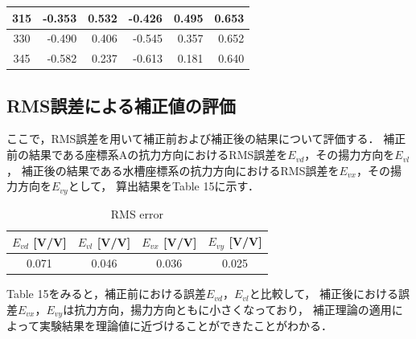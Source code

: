 \begin{table}[htbp]
\begin{center}
\begin{tabular}{|p{20mm}|p{20mm}|p{20mm}|p{20mm}|p{20mm}|p{20mm}|}
      \multicolumn{1}{|c|}{315}                     & \multicolumn{1}{|r|}{-0.353}               & \multicolumn{1}{|r|}{0.532}                & \multicolumn{1}{|r|}{-0.426}               & \multicolumn{1}{|r|}{0.495}                & \multicolumn{1}{|r|}{0.653}                    \\ \hline
      \multicolumn{1}{|c|}{330}                     & \multicolumn{1}{|r|}{-0.490}               & \multicolumn{1}{|r|}{0.406}                & \multicolumn{1}{|r|}{-0.545}               & \multicolumn{1}{|r|}{0.357}                & \multicolumn{1}{|r|}{0.652}                    \\ \hline
      \multicolumn{1}{|c|}{345}                     & \multicolumn{1}{|r|}{-0.582}               & \multicolumn{1}{|r|}{0.237}                & \multicolumn{1}{|r|}{-0.613}               & \multicolumn{1}{|r|}{0.181}                & \multicolumn{1}{|r|}{0.640}                    \\ \hline
    \end{tabular}
  \end{center}
\end{table}

\newpage

\subsection{RMS誤差による補正値の評価}

ここで，RMS誤差を用いて補正前および補正後の結果について評価する．
補正前の結果である座標系Aの抗力方向におけるRMS誤差を$E_{vd}$，その揚力方向を$E_{vl}$，
補正後の結果である水槽座標系の抗力方向におけるRMS誤差を$E_{vx}$，その揚力方向を$E_{vy}$として，
算出結果をTable 15に示す．

\begin{table}[htbp]
  \begin{center}
    \caption{RMS error}
    \begin{tabular}{|p{20mm}|p{20mm}p{20mm}|p{20mm}|}
      \hline
      \multicolumn{1}{|c|}{$E_{vd}$ [V/V]} & \multicolumn{1}{|c|}{$E_{vl}$ [V/V]} & \multicolumn{1}{|c|}{$E_{vx}$ [V/V]} & \multicolumn{1}{|c|}{$E_{vy}$ [V/V]} \\ \hline
      \multicolumn{1}{|c|}{0.071}          & \multicolumn{1}{|c|}{0.046}          & \multicolumn{1}{|c|}{0.036}          & \multicolumn{1}{|c|}{0.025}          \\ \hline
    \end{tabular}
  \end{center}
\end{table}

Table 15をみると，補正前における誤差$E_{vd}$，$E_{vl}$と比較して，
補正後における誤差$E_{vx}$，$E_{vy}$は抗力方向，揚力方向ともに小さくなっており，
補正理論の適用によって実験結果を理論値に近づけることができたことがわかる．
